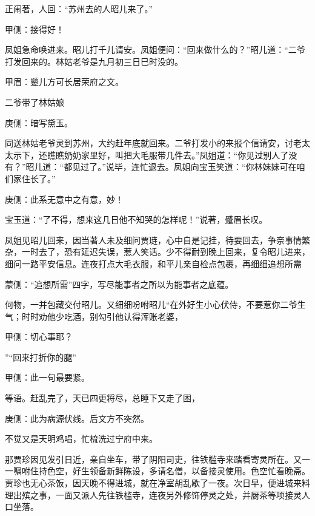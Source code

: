 \begin{parag}
    正闹著，人回：“苏州去的人昭儿来了。”\begin{note}甲侧：接得好！\end{note}凤姐急命唤进来。昭儿打千儿请安。凤姐便问：“回来做什么的？”昭儿道：“二爷打发回来的。林姑老爷是九月初三日巳时没的。\begin{note}甲眉：颦儿方可长居荣府之文。\end{note}二爷带了林姑娘\begin{note}庚侧：暗写黛玉。\end{note}同送林姑老爷灵到苏州，大约赶年底就回来。二爷打发小的来报个信请安，讨老太太示下，还瞧瞧奶奶家里好，叫把大毛服带几件去。”凤姐道：“你见过别人了没有？”昭儿道：“都见过了。”说毕，连忙退去。凤姐向宝玉笑道：“你林妹妹可在咱们家住长了。”\begin{note}庚侧：此系无意中之有意，妙！\end{note}宝玉道：“了不得，想来这几日他不知哭的怎样呢！”说著，蹙眉长叹。
\end{parag}


\begin{parag}
    凤姐见昭儿回来，因当著人未及细问贾琏，心中自是记挂，待要回去，争奈事情繁杂，一时去了，恐有延迟失误，惹人笑话。少不得耐到晚上回来，复令昭儿进来，细问一路平安信息。连夜打点大毛衣服，和平儿亲自检点包裹，再细细追想所需\begin{note}蒙侧：“追想所需”四字，写尽能事者之所以为能事者之底蕴。\end{note}何物，一并包藏交付昭儿。又细细吩咐昭儿“在外好生小心伏侍，不要惹你二爷生气；时时劝他少吃酒，别勾引他认得浑账老婆，\begin{note}甲侧：切心事耶？\end{note}”“回来打折你的腿”\begin{note}甲侧：此一句最要紧。\end{note}等语。赶乱完了，天已四更将尽，总睡下又走了困，\begin{note}庚侧：此为病源伏线。后文方不突然。\end{note}不觉又是天明鸡唱，忙梳洗过宁府中来。
\end{parag}


\begin{parag}
    那贾珍因见发引日近，亲自坐车，带了阴阳司吏，往铁槛寺来踏看寄灵所在。又一一嘱咐住持色空，好生领备新鲜陈设，多请名僧，以备接灵使用。色空忙看晚斋。贾珍也无心茶饭，因天晚不得进城，就在净室胡乱歇了一夜。次日早，便进城来料理出殡之事，一面又派人先往铁槛寺，连夜另外修饰停灵之处，并厨茶等项接灵人口坐落。
\end{parag}


